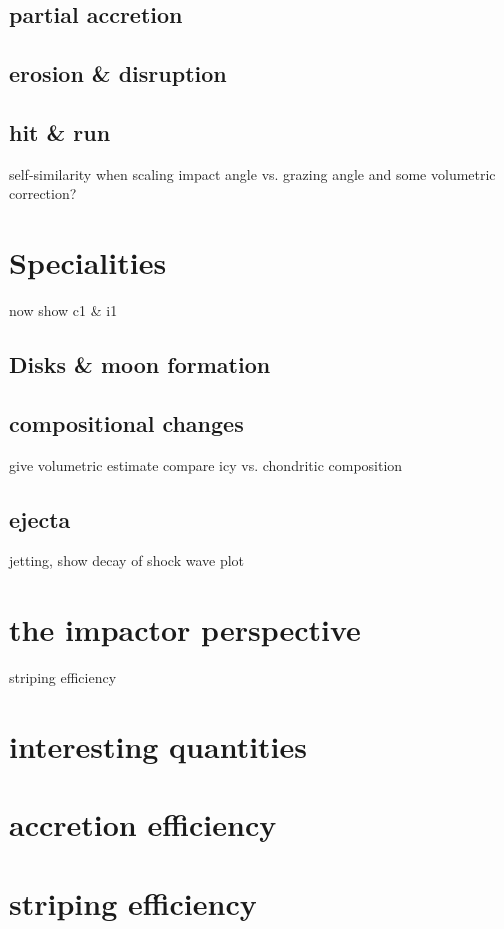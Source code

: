 \subsection{partial accretion}
\subsection{erosion \& disruption}
\subsection{hit \& run}


self-similarity when scaling impact angle vs. grazing angle and some volumetric correction?

\section{Specialities}
now show c1 \& i1
\subsection{Disks \& moon formation}

\subsection{compositional changes}
give volumetric estimate
compare icy vs. chondritic composition

\subsection{ejecta}
jetting, show decay of shock wave plot

\section{the impactor perspective}
striping efficiency


\section{interesting quantities}
\section{accretion efficiency}
\section{striping efficiency}

